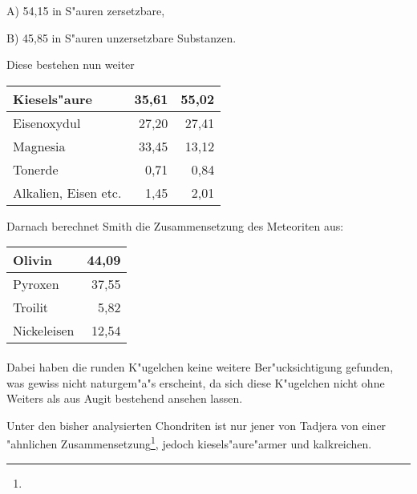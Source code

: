 \documentclass[a4paper, 11pt, oneside]{article}
\begin{document}
A) 54,15 in S"auren zersetzbare,

B) 45,85 in S"auren unzersetzbare Substanzen.

Diese bestehen nun weiter
\begin{center}
    \begin{tabular}{ |l|r|r| } 
    \hline
    Kiesels"aure & 35,61 & 55,02\\\hline
    Eisenoxydul & 27,20 & 27,41\\\hline
    Magnesia & 33,45 & 13,12\\\hline
    Tonerde & 0,71 & 0,84\\\hline
    Alkalien, Eisen etc. & 1,45 & 2,01\\
    \hline
    \end{tabular}
\end{center}
Darnach berechnet Smith die Zusammensetzung des Meteoriten aus:
\begin{center}
    \begin{tabular}{ |l|r| } 
    \hline
    Olivin & 44,09\\\hline
    Pyroxen & 37,55\\\hline
    Troilit & 5,82\\\hline
    Nickeleisen & 12,54\\
    \hline
    \end{tabular}
\end{center}
\paragraph{}
Dabei haben die runden K"ugelchen keine weitere Ber"ucksichtigung gefunden, was gewiss nicht naturgem"a"s erscheint, da sich diese K"ugelchen nicht ohne Weiters als aus Augit bestehend ansehen lassen.

Unter den bisher analysierten Chondriten ist nur jener von Tadjera von einer "ahnlichen Zusammensetzung\footnote{}, jedoch kiesels"aure"armer und kalkreichen.
\end{document}
